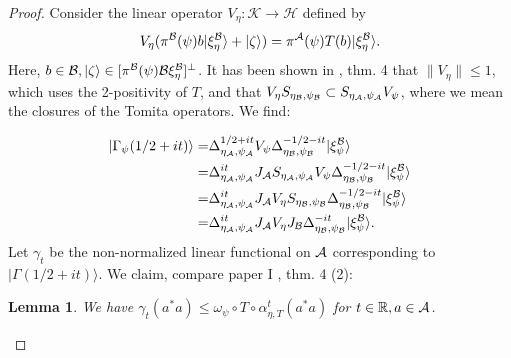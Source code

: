 \documentclass[english,a4paper,12pt]{article}
\newtheorem{lemma}{Lemma}
\def\sH{\mathscr{H}}
\def\sK{\mathscr{K}}
\def\cA{{\mathfrak A}}
\def\cB{{\mathfrak B}}
\newcommand{\ca}[1]{{\cal #1}}
\newcommand{\ben}{\begin{equation}}
\newcommand{\een}{\end{equation}}
\def\cA{{\ca A}}
\def\cB{{\ca B}}
\newcommand{\RR}{\mathbb{R}}
\begin{document}
\begin{proof}
Consider the linear operator $V_\eta: \sK \to \sH$ defined by 
\ben
V_\eta(\pi^\cB(\psi) b|\xi_{\eta}^{\cB} \rangle+ |\zeta\rangle) = \pi^\cA(\psi)T(b)|\xi_{\eta}^{\cB}\rangle.
\een 
Here, $b \in \cB, |\zeta\rangle \in [\pi^\cB(\psi) \cB \xi_{\eta}^{\cB}]^\perp$. 
It has been shown in \cite{Petz4}, thm. 4 that $\|V_\eta \| \le 1$, which uses the 2-positivity of $T$, 
and that $V_\eta S_{\eta_\cB, \psi_\cB} \subset S_{\eta_\cA, \psi_\cA} V_\psi$, where 
we mean the closures of the Tomita operators. We find:

\ben\label{eq:Gupper1}
\begin{split}
|\Gamma_\psi(1/2+it)\rangle
=&\Delta_{\eta_\cA,\psi_\cA}^{1/2 + it} V_{\psi} \Delta_{\eta_\cB,\psi_\cB}^{-1/2 -it} |\xi_{\psi}^{\cB}\rangle\\
=&\Delta_{\eta_\cA,\psi_\cA}^{it} J_\cA S_{\eta_\cA, \psi_\cA} V_{\psi} \Delta_{\eta_\cB,\psi_\cB}^{-1/2 -it} |\xi_{\psi}^{\cB}\rangle\\
=&\Delta_{\eta_\cA,\psi_\cA}^{it} J_\cA V_\eta S_{\eta_\cB, \psi_\cB} \Delta_{\eta_\cB,\psi_\cB}^{-1/2 -it} |\xi_{\psi}^{\cB}\rangle\\
=&\Delta_{\eta_\cA,\psi_\cA}^{it} J_\cA V_{\eta} J_{\cB} \Delta_{\eta_\cB,\psi_\cB}^{-it} |\xi_{\psi}^{\cB}\rangle. 
\end{split}
\een
Let $\gamma_t$ be the non-normalized linear functional on $\cA$ 
corresponding to $|\Gamma(1/2+it)\rangle$. We claim, compare paper I  \cite{Faulkner:2020iou}, thm. 4 (2):

\begin{lemma}
\label{lem:mon}
We have $\gamma_t(a^* a) \le \omega_\psi \circ T \circ \alpha^t_{\eta,T}(a^* a)$ for $t \in \RR, a \in \cA$.
\end{lemma}


\end{proof}
\end{document}
